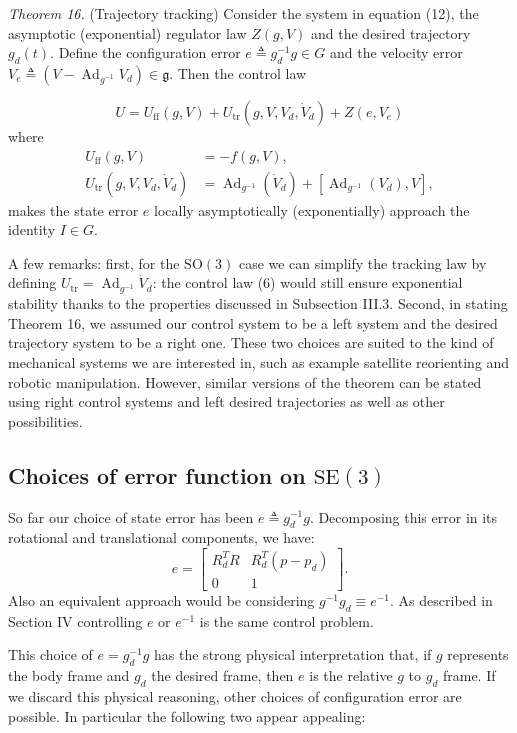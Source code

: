 \documentclass[10pt,twocolumn]{article}
\newcommand{\SO}{\mathrm{SO}}
\newcommand{\SE}{\mathrm{SE}}
\newcommand{\gfrak}{\mathfrak g}
\newcommand{\Ad}{\operatorname{Ad}}
\newcommand{\paperhead}[2]{\par\medskip\noindent\textit{#1} #2\par}
\begin{document}
\paperhead{Theorem 16.}{(Trajectory tracking) Consider the system in equation (12), the asymptotic (exponential) regulator law $Z(g,V)$ and the desired trajectory $g_d(t)$. Define the configuration error $e\triangleq g_d^{-1}g\in G$ and the velocity error $V_e\triangleq(V-\Ad_{g^{-1}}V_d)\in\gfrak$. Then the control law}
\begin{equation*}
U=U_{\mathrm{ff}}(g,V)+U_{\mathrm{tr}}(g,V,V_d,\dot V_d)+Z(e,V_e)
\end{equation*}
where
\begin{align*}
U_{\mathrm{ff}}(g,V)&=-f(g,V),\\
U_{\mathrm{tr}}(g,V,V_d,\dot V_d)
&=\Ad_{g^{-1}}(\dot V_d)+[\Ad_{g^{-1}}(V_d),V],
\end{align*}
makes the state error $e$ locally asymptotically (exponentially) approach the identity $I\in G$.

A few remarks: first, for the $\SO(3)$ case we can simplify the tracking law by defining $U_{\mathrm{tr}}=\Ad_{g^{-1}}\dot V_d$: the control law (6) would still ensure exponential stability thanks to the properties discussed in Subsection III.3. Second, in stating Theorem 16, we assumed our control system to be a left system and the desired trajectory system to be a right one. These two choices are suited to the kind of mechanical systems we are interested in, such as example satellite reorienting and robotic manipulation. However, similar versions of the theorem can be stated using right control systems and left desired trajectories as well as other possibilities.

\subsection{Choices of error function on $\SE(3)$}
So far our choice of state error has been $e\triangleq g_d^{-1}g$. Decomposing this error in its rotational and translational components, we have:
\begin{equation*}
e=\begin{bmatrix}
R_d^TR&R_d^T(p-p_d)\\
0&1
\end{bmatrix}.\tag{13}
\end{equation*}
Also an equivalent approach would be considering $g^{-1}g_d\equiv e^{-1}$. As described in Section IV controlling $e$ or $e^{-1}$ is the same control problem.

This choice of $e=g_d^{-1}g$ has the strong physical interpretation that, if $g$ represents the body frame and $g_d$ the desired frame, then $e$ is the relative $g$ to $g_d$ frame. If we discard this physical reasoning, other choices of configuration error are possible. In particular the following two appear appealing:
\end{document}
